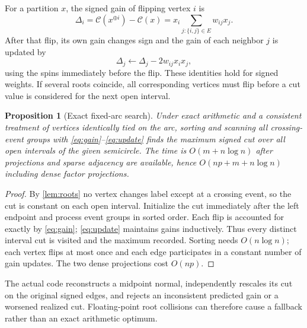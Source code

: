\documentclass[10pt,letterpaper]{article}
\newtheorem{proposition}{Proposition}
\newcommand{\Ccut}{\mathcal C}
\begin{document}
For a partition \(x\), the signed gain of flipping vertex \(i\) is
\begin{equation}\label{eq:gain}
\Delta_i=\Ccut(x^{\oplus i})-\Ccut(x)
=x_i\sum_{j:\{i,j\}\in E}w_{ij}x_j.
\end{equation}
After that flip, its own gain changes sign and the gain of each neighbor \(j\) is updated by
\begin{equation}\label{eq:update}
\Delta_j\gets\Delta_j-2w_{ij}x_ix_j,
\end{equation}
using the spins immediately before the flip. These identities hold for signed weights. If several roots coincide, all corresponding vertices must flip before a cut value is considered for the next open interval.

\begin{proposition}[Exact fixed-arc search]\label{prop:exact}
Under exact arithmetic and a consistent treatment of vertices identically tied on the arc, sorting and scanning all crossing-event groups with \eqref{eq:gain}--\eqref{eq:update} finds the maximum signed cut over all open intervals of the given semicircle. The time is \(O(m+n\log n)\) after projections and sparse adjacency are available, hence \(O(np+m+n\log n)\) including dense factor projections.
\end{proposition}
\begin{proof}
By \cref{lem:roots} no vertex changes label except at a crossing event, so the cut is constant on each open interval. Initialize the cut immediately after the left endpoint and process event groups in sorted order. Each flip is accounted for exactly by \eqref{eq:gain}; \eqref{eq:update} maintains gains inductively. Thus every distinct interval cut is visited and the maximum recorded. Sorting needs \(O(n\log n)\); each vertex flips at most once and each edge participates in a constant number of gain updates. The two dense projections cost \(O(np)\).
\end{proof}
The actual code reconstructs a midpoint normal, independently rescales its cut on the original signed edges, and rejects an inconsistent predicted gain or a worsened realized cut. Floating-point root collisions can therefore cause a fallback rather than an exact arithmetic optimum.
\end{document}

